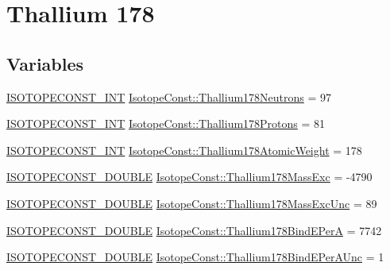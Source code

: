 \hypertarget{group___isotope_const-_thallium-_tl178}{}\section{Thallium 178}
\label{group___isotope_const-_thallium-_tl178}
\subsection*{Variables}
\begin{DoxyCompactItemize}
\item 
\mbox{\hyperlink{group___isotope_const-_macros_ga5f18360b3e99483a35c32d789e62621c}{I\+S\+O\+T\+O\+P\+E\+C\+O\+N\+S\+T\+\_\+\+I\+NT}} \mbox{\hyperlink{group___isotope_const-_thallium-_tl178_gaae1a8755a03e505adbab10b22e21f537}{Isotope\+Const\+::\+Thallium178\+Neutrons}} = 97
\item 
\mbox{\hyperlink{group___isotope_const-_macros_ga5f18360b3e99483a35c32d789e62621c}{I\+S\+O\+T\+O\+P\+E\+C\+O\+N\+S\+T\+\_\+\+I\+NT}} \mbox{\hyperlink{group___isotope_const-_thallium-_tl178_ga6c6ef51414d33bfffb2f2743f9264767}{Isotope\+Const\+::\+Thallium178\+Protons}} = 81
\item 
\mbox{\hyperlink{group___isotope_const-_macros_ga5f18360b3e99483a35c32d789e62621c}{I\+S\+O\+T\+O\+P\+E\+C\+O\+N\+S\+T\+\_\+\+I\+NT}} \mbox{\hyperlink{group___isotope_const-_thallium-_tl178_ga18d43b06634f1d7a5ac669759b17563e}{Isotope\+Const\+::\+Thallium178\+Atomic\+Weight}} = 178
\item 
\mbox{\hyperlink{group___isotope_const-_macros_ga8f45a7272ce02c0b4c65c44636ed719a}{I\+S\+O\+T\+O\+P\+E\+C\+O\+N\+S\+T\+\_\+\+D\+O\+U\+B\+LE}} \mbox{\hyperlink{group___isotope_const-_thallium-_tl178_ga9bdb5a9ca435b014cd90dfe035ab5997}{Isotope\+Const\+::\+Thallium178\+Mass\+Exc}} = -\/4790
\item 
\mbox{\hyperlink{group___isotope_const-_macros_ga8f45a7272ce02c0b4c65c44636ed719a}{I\+S\+O\+T\+O\+P\+E\+C\+O\+N\+S\+T\+\_\+\+D\+O\+U\+B\+LE}} \mbox{\hyperlink{group___isotope_const-_thallium-_tl178_ga0c444e5b7a298cb2f4a7408cde30a586}{Isotope\+Const\+::\+Thallium178\+Mass\+Exc\+Unc}} = 89
\item 
\mbox{\hyperlink{group___isotope_const-_macros_ga8f45a7272ce02c0b4c65c44636ed719a}{I\+S\+O\+T\+O\+P\+E\+C\+O\+N\+S\+T\+\_\+\+D\+O\+U\+B\+LE}} \mbox{\hyperlink{group___isotope_const-_thallium-_tl178_ga7ac54331eb750cf061ab7d29913ac12b}{Isotope\+Const\+::\+Thallium178\+Bind\+E\+PerA}} = 7742
\item 
\mbox{\hyperlink{group___isotope_const-_macros_ga8f45a7272ce02c0b4c65c44636ed719a}{I\+S\+O\+T\+O\+P\+E\+C\+O\+N\+S\+T\+\_\+\+D\+O\+U\+B\+LE}} \mbox{\hyperlink{group___isotope_const-_thallium-_tl178_gaabeded23345a927a211b52428f482ddd}{Isotope\+Const\+::\+Thallium178\+Bind\+E\+Per\+A\+Unc}} = 1

\end{DoxyCompactItemize}
